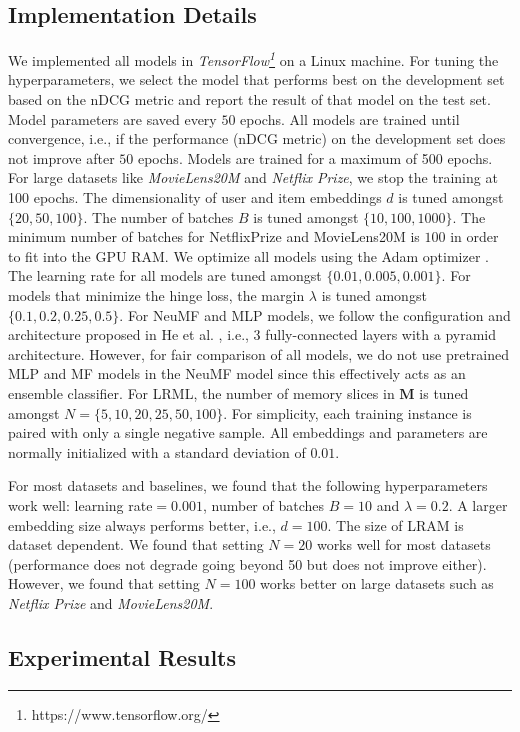 \documentclass[sigconf]{acmart}
\begin{document}
\subsection{Implementation Details}
We implemented all models in \textit{TensorFlow\footnote{https://www.tensorflow.org/}} on a Linux machine. For tuning the hyperparameters, we select the model that performs best on the development set based on the nDCG metric and report the result of that model on the test set. Model parameters are saved every $50$ epochs. All models are trained until convergence, i.e., if the performance (nDCG metric) on the development set does not improve after $50$ epochs. Models are trained for a maximum of 500 epochs. For large datasets like \textit{MovieLens20M} and \textit{Netflix Prize}, we stop the training at 100 epochs. The dimensionality of user and item embeddings $d$ is tuned amongst $\{20, 50,100\}$. The number of batches $B$ is tuned amongst $\{10,100,1000\}$. The minimum number of batches for NetflixPrize and MovieLens20M is $100$ in order to fit into the GPU RAM. We optimize all models using the Adam optimizer \cite{DBLP:journals/corr/KingmaB14}. The learning rate for all models are tuned amongst $\{0.01,0.005,0.001\}$. For models that minimize the hinge loss, the margin $\lambda$ is tuned amongst $\{0.1,0.2,0.25,0.5\}$. For NeuMF and MLP models, we follow the configuration and architecture proposed in He et al. \cite{He:2017:NCF:3038912.3052569}, i.e., 3 fully-connected layers with a pyramid architecture. However, for fair comparison of all models, we do not use pretrained MLP and MF models in the NeuMF model since this effectively acts as an ensemble classifier. For \textsc{LRML}, the number of memory slices in $\textbf{M}$ is tuned amongst $N=\{5,10,20,25,50,100\}$. For simplicity, each training instance is paired with only a single negative sample. All embeddings and parameters are normally initialized with a standard deviation of $0.01$.

For most datasets and baselines, we found that the following hyperparameters work well: learning rate$=0.001$, number of batches $B=10$ and $\lambda=0.2$. A larger embedding size always performs better, i.e., $d=100$. The size of LRAM is dataset dependent. We found that setting $N=20$ works well for most datasets (performance does not degrade going beyond 50 but does not improve either). However, we found that setting $N=100$ works better on large datasets such as \textit{Netflix Prize} and \textit{MovieLens20M}.  

\subsection{Experimental Results}
\end{document}
